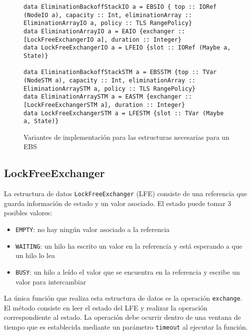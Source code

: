 \begin{figure}[H]
  \begin{verbatim}
data EliminationBackoffStackIO a = EBSIO { top :: IORef (NodeIO a), capacity :: Int, eliminationArray :: EliminationArrayIO a, policy :: TLS RangePolicy}
data EliminationArrayIO a = EAIO {exchanger :: [LockFreeExchangerIO a], duration :: Integer}
data LockFreeExchangerIO a = LFEIO {slot :: IORef (Maybe a, State)}

data EliminationBackoffStackSTM a = EBSSTM {top :: TVar (NodeSTM a), capacity :: Int, eliminationArray :: EliminationArraySTM a, policy :: TLS RangePolicy}
data EliminationArraySTM a = EASTM {exchanger :: [LockFreeExchangerSTM a], duration :: Integer}
data LockFreeExchangerSTM a = LFESTM {slot :: TVar (Maybe a, State)}
\end{verbatim}
\caption{Variantes de implementación para las estructuras necesarias para un EBS}
\label{fig:ebs-reps}
\end{figure}

\clearpage
\subsection{LockFreeExchanger}\label{sub-lfe}
La estructura de datos \texttt{LockFreeExchanger} (LFE) consiste de una referencia que guarda información de estado y un valor asociado. El estado puede tomar 3 posibles valores:

\begin{itemize}
\item{\texttt{EMPTY}: no hay ningún valor asociado a la referencia}
\item{\texttt{WAITING}: un hilo ha escrito un valor en la referencia y está esperando a que un hilo lo lea}
\item{\texttt{BUSY}: un hilo a leído el valor que se encuentra en la referencia y escribe un valor para intercambiar}
\end{itemize}

La única función que realiza esta estructura de datos es la operación \texttt{exchange}. El método consiste en leer el estado del LFE y realizar la operación correspondiente al estado. La operación debe ocurrir dentro de una ventana de tiempo que es establecida mediante un parámetro \texttt{timeout} al ejecutar la función.

